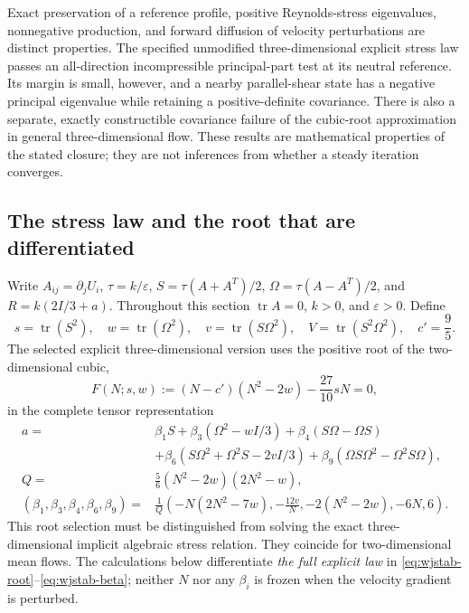 \documentclass[11pt,a4paper]{article}
\numberwithin{equation}{section}
\begin{document}
Exact preservation of a reference profile, positive Reynolds-stress
eigenvalues, nonnegative production, and forward diffusion of velocity
perturbations are distinct properties. The specified unmodified
three-dimensional explicit stress law passes an all-direction
incompressible principal-part test at its neutral reference. Its margin
is small, however, and a nearby parallel-shear state has a negative
principal eigenvalue while retaining a positive-definite covariance.
There is also a separate, exactly constructible covariance failure of the
cubic-root approximation in general three-dimensional flow. These
results are mathematical properties of the stated closure; they are not
inferences from whether a steady iteration converges.

\subsection{The stress law and the root that are differentiated}

Write $A_{ij}=\partial_j U_i$, $\tau=k/\varepsilon$,
$S=\tau(A+A^T)/2$, $\Omega=\tau(A-A^T)/2$, and
$R=k(2I/3+a)$. Throughout this section $\operatorname{tr}A=0$,
$k>0$, and $\varepsilon>0$. Define
\begin{equation}
 s=\operatorname{tr}(S^2),\quad w=\operatorname{tr}(\Omega^2),\quad
 v=\operatorname{tr}(S\Omega^2),\quad
 V=\operatorname{tr}(S^2\Omega^2),\quad c'=\frac95.
 \label{eq:wjstab-invariants}
\end{equation}
The selected explicit three-dimensional version uses the positive root
of the two-dimensional cubic,
\begin{equation}
 F(N;s,w):=(N-c')(N^2-2w)-\frac{27}{10}sN=0,
 \label{eq:wjstab-root}
\end{equation}
in the complete tensor representation
\begin{align}
 a={}&\beta_1 S+\beta_3(\Omega^2-wI/3)
       +\beta_4(S\Omega-\Omega S)\nonumber\\
 &+\beta_6(S\Omega^2+\Omega^2S-2vI/3)
       +\beta_9(\Omega S\Omega^2-\Omega^2S\Omega),
 \label{eq:wjstab-stress}\\
 Q={}&\frac56(N^2-2w)(2N^2-w),\nonumber\\
 (\beta_1,\beta_3,\beta_4,\beta_6,\beta_9)
 ={}&\frac1Q\left(-N(2N^2-7w),-\frac{12v}{N},
                    -2(N^2-2w),-6N,6\right).
 \label{eq:wjstab-beta}
\end{align}
This root selection must be distinguished from solving the exact
three-dimensional implicit algebraic stress relation. They coincide
for two-dimensional mean flows. The calculations below differentiate
\emph{the full explicit law} in
\eqref{eq:wjstab-root}--\eqref{eq:wjstab-beta}; neither $N$ nor any
$\beta_i$ is frozen when the velocity gradient is perturbed.
\end{document}
